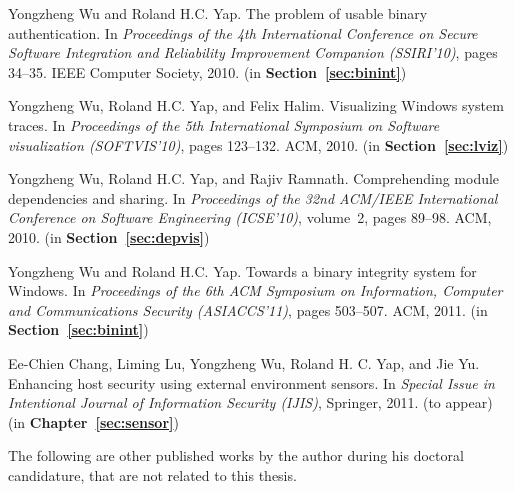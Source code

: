 \begin{tightenumerate}
\item
Yongzheng Wu and Roland H.C. Yap.
\newblock The problem of usable binary authentication.
\newblock In {\em Proceedings of the 4th International Conference on Secure
  Software Integration and Reliability Improvement Companion (SSIRI'10)}, pages 34--35.
  IEEE Computer Society, 2010.
\newblock (in {\bf Section~\ref{sec:binint}})

\item
Yongzheng Wu, Roland H.C. Yap, and Felix Halim.
\newblock Visualizing Windows system traces.
\newblock In {\em Proceedings of the 5th International Symposium on Software
  visualization (SOFTVIS'10)}, pages 123--132. ACM, 2010.
\newblock (in {\bf Section~\ref{sec:lviz}})

\item
Yongzheng Wu, Roland H.C. Yap, and Rajiv Ramnath.
\newblock Comprehending module dependencies and sharing.
\newblock In {\em Proceedings of the 32nd ACM/IEEE International Conference on
  Software Engineering (ICSE'10)}, volume~2, pages 89--98. ACM, 2010.
\newblock (in {\bf Section~\ref{sec:depvis}})

\item
Yongzheng Wu and Roland H.C. Yap.
\newblock Towards a binary integrity system for Windows.
\newblock In {\em Proceedings of the 6th ACM Symposium on Information, Computer
  and Communications Security (ASIACCS'11)},
  pages 503--507. ACM, 2011.
\newblock (in {\bf Section~\ref{sec:binint}})

\item
Ee-Chien Chang, Liming Lu, Yongzheng Wu, Roland H. C. Yap, and Jie Yu.
\newblock Enhancing host security using external environment sensors.
\newblock In {\em Special Issue in Intentional Journal of Information Security (IJIS)},
  Springer, 2011. (to appear)
\newblock (in {\bf Chapter~\ref{sec:sensor}})
\end{tightenumerate}

The following are other published works by the author during
his doctoral candidature, that are not related to this thesis.

